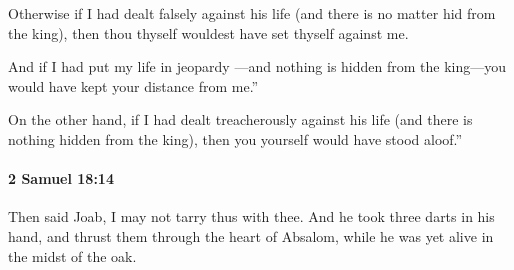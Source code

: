 			\begin{versebox}
					\item[BHS] 
					\item[ASV] Otherwise if I had dealt falsely against his life (and there is no matter hid from the king), then thou thyself wouldest have set thyself against me.
					\item[NIV] And if I had put my life in jeopardy —and nothing is hidden from the king—you would have kept your distance from me.”
					\item[NRSV] On the other hand, if I had dealt treacherously against his life (and there is nothing hidden from the king), then you yourself would have stood aloof.”
			\end{versebox}

		\paragraph{2 Samuel 18:14} %
			\label{2SAMUEL-18-14}

			Then said Joab, I may not tarry thus with thee. And he took three darts in his hand, and thrust them through the heart of Absalom, while he was yet alive in the midst of the oak.


